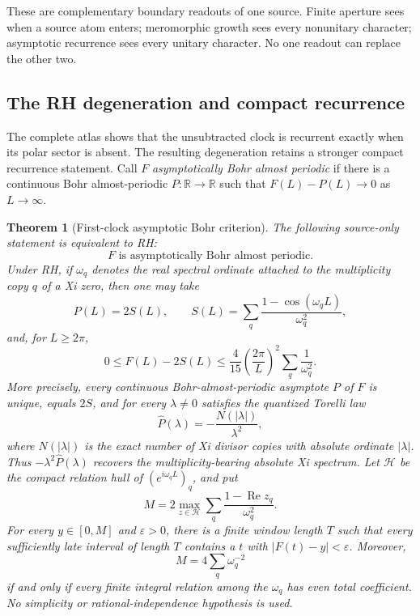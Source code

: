 \documentclass[11pt]{article}
\newtheorem{theorem}{Theorem}[section]
\theoremstyle{definition}
\theoremstyle{remark}
\newcommand{\R}{\mathbb R}
\newcommand{\Rea}{\operatorname{Re}}
\begin{document}
These are complementary boundary readouts of one source.  Finite aperture sees when a source
atom enters; meromorphic growth sees every nonunitary character; asymptotic recurrence sees every
unitary character.  No one readout can replace the other two.

\subsection{The RH degeneration and compact recurrence}

The complete atlas shows that the unsubtracted clock is recurrent exactly when its polar sector
is absent.  The resulting degeneration retains a stronger compact recurrence statement.  Call
$F$ \emph{asymptotically Bohr almost periodic} if there is a continuous Bohr
almost-periodic $P:\R\to\R$ such that $F(L)-P(L)\to0$ as $L\to\infty$.

\begin{theorem}[First-clock asymptotic Bohr criterion]
\label{thm:first-clock-bohr}
The following source-only statement is equivalent to RH:
\[
 F\text{ is asymptotically Bohr almost periodic}.
 \tag{3.16}\label{eq:bohr-rh-criterion}
\]
Under RH, if $\omega_q$ denotes the real spectral ordinate attached to the multiplicity copy
$q$ of a Xi zero, then one may take
\[
 P(L)=2S(L),\qquad
 S(L)=\sum_q\frac{1-\cos(\omega_qL)}{\omega_q^2},
 \tag{3.17}\label{eq:explicit-screw-asymptote}
\]
and, for $L\ge2\pi$,
\[
 0\le F(L)-2S(L)
 \le\frac4{15}\left(\frac{2\pi}{L}\right)^2
       \sum_q\frac1{\omega_q^2}.
 \tag{3.18}\label{eq:first-clock-error}
\]
More precisely, every continuous Bohr-almost-periodic asymptote $P$ of $F$ is unique, equals
$2S$, and for every $\lambda\ne0$ satisfies the quantized Torelli law
\[
 \widehat P(\lambda)=-\frac{N(|\lambda|)}{\lambda^2},
 \tag{3.19}\label{eq:first-clock-torelli}
\]
where $N(|\lambda|)$ is the exact number of Xi divisor copies with absolute ordinate
$|\lambda|$.  Thus $-\lambda^2\widehat P(\lambda)$ recovers the multiplicity-bearing absolute
Xi spectrum.
Let $\mathcal H$ be the compact relation hull of
$(e^{i\omega_qL})_q$, and put
\[
 M=2\max_{z\in\mathcal H}
 \sum_q\frac{1-\Rea z_q}{\omega_q^2}.
 \tag{3.20}\label{eq:relation-hull-maximum}
\]
For every $y\in[0,M]$ and $\varepsilon>0$, there is a finite window length $T$ such that
every sufficiently late interval of length $T$ contains a $t$ with
$|F(t)-y|<\varepsilon$.  Moreover,
\[
 M=4\sum_q\omega_q^{-2}
 \tag{3.21}\label{eq:absolute-hull-endpoint}
\]
if and only if every finite integral relation among the $\omega_q$ has even total coefficient.
No simplicity or rational-independence hypothesis is used.
\end{theorem}
\end{document}
